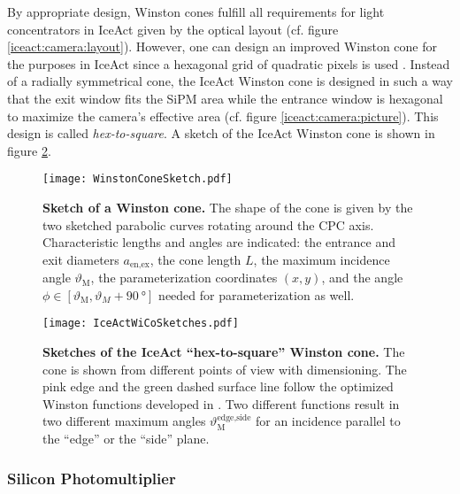 By appropriate design, Winston cones fulfill all requirements for light concentrators in IceAct given by the optical layout (cf. figure \ref{iceact:camera:layout}).
However, one can design an improved Winston cone for the purposes in IceAct since a hexagonal grid of quadratic pixels is used . Instead of a radially symmetrical cone, the IceAct Winston cone is designed in such a way that the exit window fits the SiPM area while the entrance window is hexagonal to maximize the camera's effective area (cf. figure \ref{iceact:camera:picture}). This design is called \textit{hex-to-square}. A sketch of the IceAct Winston cone is shown in figure \ref{iceact:camera:iceact_wico_sketch}. 

\begin{figure}
	\centering
	\texttt{[image: WinstonConeSketch.pdf]}
	\caption[Sketch of a Winston cone]{\textbf{Sketch of a Winston cone.} \cite{iceact:camera} The shape of the cone is given by the two sketched parabolic curves rotating around the CPC axis. Characteristic lengths and angles are indicated: the entrance and exit diameters $a_\text{en,ex}$, the cone length $L$, the maximum incidence angle $\vartheta_\text{M}$, the parameterization coordinates $(x,y)$, and the angle $\phi\in[\vartheta_\text{M},\vartheta_M+\SI{90}{\degree}]$ needed for parameterization as well.}
	\label{iceact:camera:wico_sketch}	
\end{figure}

\begin{figure}
	\centering
	\texttt{[image: IceActWiCoSketches.pdf]}
	\caption[Sketches of the IceAct \enquote{hex-to-square} Winston cone]{\textbf{Sketches of the IceAct \enquote{hex-to-square} Winston cone.} The cone is shown from different points of view with dimensioning. The pink edge and the green dashed surface line follow the optimized Winston functions developed in \cite{iceact:camera}. Two different functions result in two different maximum angles $\vartheta_\text{M}^\text{edge,side}$ for an incidence parallel to the \enquote{edge} or the \enquote{side} plane.}
	\label{iceact:camera:iceact_wico_sketch}	
\end{figure}

\subsubsection{Silicon Photomultiplier}\label{sec:sipm}


